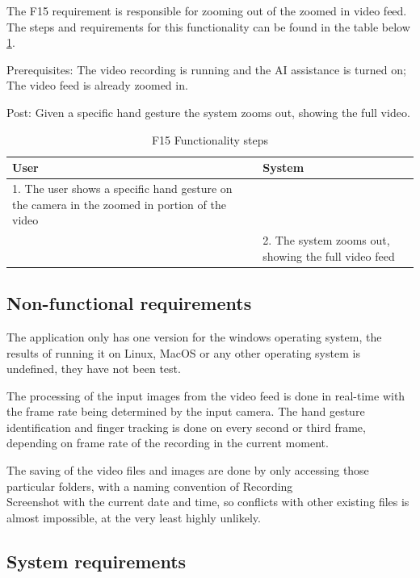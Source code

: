 \par The F15 requirement is responsible for zooming out of the zoomed in video feed. The steps and requirements for this functionality can be found in the table below \ref{F15Table}.
\par Prerequisites: The video recording is running and the AI assistance is turned on; The video feed is already zoomed in.
\par Post: Given a specific hand gesture the system zooms out, showing the full video.

\begin{table}[htbp]
\begin{center}
\begin{tabular}
{|p{180pt}|p{180pt}|}
\hline
 User & System\\
\hline 
\hline 1. The user shows a specific hand gesture on the camera in the zoomed in portion of the video &  \\
\hline  & 2. The system zooms out, showing the full video feed \\
\hline
\end{tabular}
\end{center}
\caption{F15 Functionality steps}
\label{F15Table}
\end{table}

\subsection{Non-functional requirements}
\label{sec:specssec1subsec2}

\par The application only has one version for the windows operating system, the results of running it on Linux, MacOS or any other operating system is undefined, they have not been test.
\par The processing of the input images from the video feed is done in real-time with the frame rate being determined by the input camera. The hand gesture identification and finger tracking is done on every second or third frame, depending on frame rate of the recording in the current moment.
\par The saving of the video files and images are done by only accessing those particular folders, with a naming convention of Recording\\Screenshot with the current date and time, so conflicts with other existing files is almost impossible, at the very least highly unlikely.

\subsection{System requirements}
\label{sec:specssec1subsec3}

